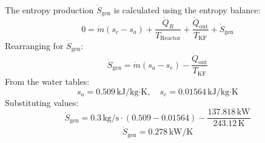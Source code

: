 The entropy production \( \dot{S}_{\text{gen}} \) is calculated using the entropy balance:  
\[
0 = \dot{m} (s_c - s_a) + \frac{\dot{Q}_R}{T_{\text{Reactor}}} + \frac{\dot{Q}_{\text{out}}}{T_{\text{KF}}} + \dot{S}_{\text{gen}}
\]  
Rearranging for \( \dot{S}_{\text{gen}} \):  
\[
\dot{S}_{\text{gen}} = \dot{m} (s_a - s_e) - \frac{\dot{Q}_{\text{out}}}{T_{\text{KF}}}
\]  
From the water tables:  
\[
s_a = 0.509 \, \text{kJ/kg·K}, \quad s_e = 0.01564 \, \text{kJ/kg·K}
\]  
Substituting values:  
\[
\dot{S}_{\text{gen}} = 0.3 \, \text{kg/s} \cdot (0.509 - 0.01564) - \frac{137.818 \, \text{kW}}{243.12 \, \text{K}}
\]  
\[
\dot{S}_{\text{gen}} = 0.278 \, \text{kW/K}
\]